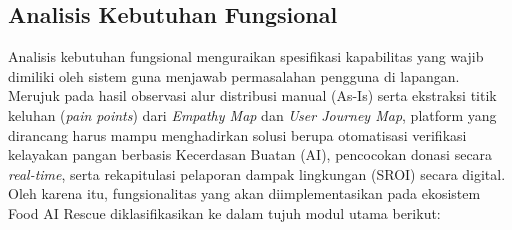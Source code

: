 \subsection{Analisis Kebutuhan Fungsional}
Analisis kebutuhan fungsional menguraikan spesifikasi kapabilitas yang wajib dimiliki oleh sistem guna menjawab permasalahan pengguna di lapangan. Merujuk pada hasil observasi alur distribusi manual (As-Is) serta ekstraksi titik keluhan (\textit{pain points}) dari \textit{Empathy Map} dan \textit{User Journey Map}, platform yang dirancang harus mampu menghadirkan solusi berupa otomatisasi verifikasi kelayakan pangan berbasis Kecerdasan Buatan (AI), pencocokan donasi secara \textit{real-time}, serta rekapitulasi pelaporan dampak lingkungan (SROI) secara digital. Oleh karena itu, fungsionalitas yang akan diimplementasikan pada ekosistem Food AI Rescue diklasifikasikan ke dalam tujuh modul utama berikut:

